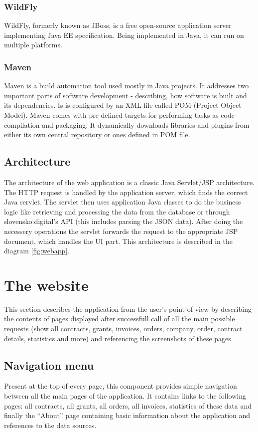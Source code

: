 \documentclass[thesis=B,english]{sprlajur-slovakopendata}[2018/05/12]
\begin{document}
\subsubsection{WildFly}
WildFly, formerly known as JBoss, is a free open-source application server implementing Java EE specification. Being implemented in Java, it can run on multiple platforms.
\subsubsection{Maven}
Maven is a build automation tool used mostly in Java projects. It addresses two important parts of software development - describing, how software is built and its dependencies. Is is configured by an XML file called POM (Project Object Model). Maven comes with pre-defined targets for performing tasks as code compilation and packaging. It dynamically downloads libraries and plugins from either its own central repository or ones defined in POM file.
	
\subsection{Architecture}
The architecture of the web application is a classic Java Servlet/JSP architecture. The HTTP request is handled by the application server, which finds the correct Java servlet. The servlet then uses application Java classes to do the business logic like retrieving and processing the data from the database or through slovensko.digital's API (this includes parsing the JSON data). After doing the necessery operations the servlet forwards the request to the appropriate JSP document, which handles the UI part. This architecture is described in the diagram \ref{fig:webapp}.


\section{The website}
This section describes the application from the user's point of view by describing the contents of pages displayed after successfull call of all the main possible requests (show all contracts, grants, invoices, orders, company, order, contract details, statistics and more) and referencing the screenshots of these pages.
	
\subsection{Navigation menu}
Present at the top of every page, this component provides simple navigation between all the main pages of the application. It contains links to the following pages: all contracts, all grants, all orders, all invoices, statistics of these data and finally the ``About'' page containing basic information about the application and references to the data sources.
\end{document}
